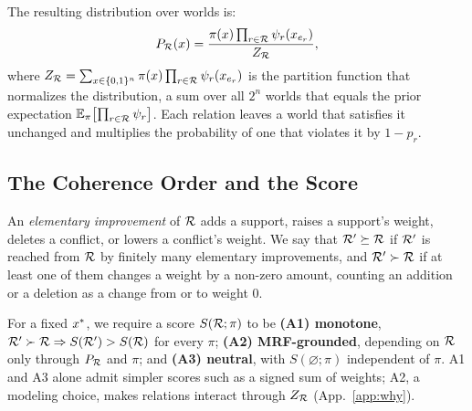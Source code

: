 The resulting distribution over worlds is:
\begin{equation}
P_{\mathcal{R}}(x)=\frac{\pi(x)\prod_{r\in\mathcal{R}}\psi_r(x_{e_r})}{Z_{\mathcal{R}}},
\label{eq:mrf}
\end{equation}
where $Z_{\mathcal{R}}=\sum_{x\in\{0,1\}^n}\pi(x)\prod_{r\in\mathcal{R}}\psi_r(x_{e_r})$ is the partition function
that normalizes the distribution, a sum over all $2^n$ worlds that equals the prior expectation
$\mathbb{E}_\pi\bigl[\prod_{r\in\mathcal{R}}\psi_r\bigr]$.
Each relation leaves a world that satisfies it unchanged and multiplies the probability of one that
violates it by $1-p_r$.



\subsection{The Coherence Order and the Score}
\label{sec:order}
\label{sec:score}

\begin{definition}
\label{def:order}
An \emph{elementary improvement} of $\mathcal{R}$ adds a support, raises a support's weight, deletes a
conflict, or lowers a conflict's weight. We say that $\mathcal{R}'\succeq\mathcal{R}$ if $\mathcal{R}'$ is reached from $\mathcal{R}$ by finitely many
elementary improvements, and $\mathcal{R}'\succ\mathcal{R}$ if at least one of them changes a weight by a non-zero
amount, counting an addition or a deletion as a change from or to weight $0$.
\end{definition}


For a fixed $x^{\ast}$, we require a score $S(\mathcal{R};\pi)$ to be \textbf{(A1) monotone},
$\mathcal{R}'\succ\mathcal{R}\Rightarrow S(\mathcal{R}')>S(\mathcal{R})$ for every $\pi$; \textbf{(A2) MRF-grounded}, depending on $\mathcal{R}$ only through
$P_{\mathcal{R}}$ and $\pi$; and \textbf{(A3) neutral}, with $S(\varnothing;\pi)$ independent of $\pi$. A1
and A3 alone admit simpler scores such as a signed sum of weights; A2, a modeling choice, makes
relations interact through $Z_{\mathcal{R}}$ (App.~\ref{app:why}).

